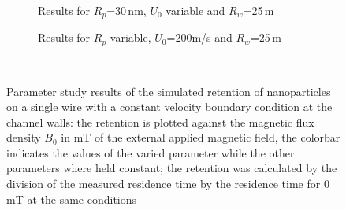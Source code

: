 \begin{figure}[H]
\begin{subfigure}{0.49\textwidth}
                  \caption{Results for $R_{p}$=30\,nm, $U_{0}$ variable and $R_{w}$=25\,\textmu m}\label{subfig:sw_constBC_U0_var}
          \end{subfigure}\hfill
        \begin{subfigure}{0.49\textwidth}
                \flushright
                \caption{Results for $R_{p}$ variable, $U_{0}$=200\textmu m/s and $R_{w}$=25\,\textmu m}\label{subfig:sw_constBC_Rp_var}
        \end{subfigure}
        \\
        
        \caption[Parameter study results of the simulated retention of nanoparticles on a single wire with a constant velocity boundary condition at the channel walls]{Parameter study results of the simulated retention of nanoparticles on a single wire with a constant velocity boundary condition at the channel walls: the retention is plotted against the magnetic flux density $B_{0}$ in mT of the external applied magnetic field, the colorbar indicates the values of the varied parameter while the other parameters where held constant; the retention was calculated by the division of the measured residence time by the residence time for 0\,mT at the same conditions}
        \label{fig:sw_param_res_constBC}
  \end{figure}
